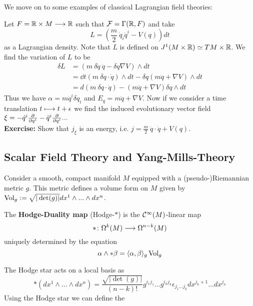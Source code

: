We move on to some examples of classical Lagrangian field theories:

\begin{example}
  Let $F= \mathbb{R} \times M \longrightarrow \mathbb{R}$ such that ${\mathcal{F}} = \Gamma(\mathbb{R}, F)$ and take
  $$L = \left(\frac{m}{2} \ \dot q_i \dot q^i - V(q) \right) dt$$
  as a Lagrangian density. Note that $L$ is defined on $J^1(M \times \mathbb{R}) \simeq TM \times \mathbb{R}$. We find the variation of $L$ to be
  \begin{align}
    \delta L &= \left( m \ \delta \dot q \ \dot q - \delta q \nabla V \right) \wedge dt \\
    &= \dd{}{t} \left( m \ \delta q \cdot \dot q \right) \wedge dt - \delta q \left( m \ddot q + \nabla V \right) \wedge dt\\
    &= d \left( m \ \delta q \cdot \dot q \right) - \left( m \ddot q + \nabla V \right) \delta q \wedge dt
  \end{align}
  Thus we have $\alpha = m \dot q^i \delta q_i$ and $E_q = m \ddot q + \nabla V$. Now if we consider a time translation $t \lmap t + \epsilon$ we find the induced evolutionary vector field $\xi = - \dot q^i \frac{\partial }{\partial q^i} - \ddot q^i \frac{\partial }{\partial q^i} ...$\\
  \textbf{Exercise:} Show that $j_\xi$ is an energy, i.e. $j = \frac{m}{2} \ \dot q \cdot \dot q + V(q)$.
\end{example}

\newpage
\subsection{Scalar Field Theory and Yang-Mills-Theory}

Consider a smooth, compact manifold $M$ equipped with a (pseudo-)Riemannian metric $g$. This metric defines a volume form on $M$ given by $\operatorname{Vol}_g := \sqrt{|\det(g)|} dx^1 \wedge ... \wedge dx^n$.

\begin{definition}
  The \textbf{Hodge-Duality map} (Hodge-$*$) is the $\mathcal{C}^{\infty}(M)$-linear map
  $$ * \colon \Omega^k(M) \longrightarrow \Omega^{n-k}(M) $$
  uniquely determined by the equation
  $$ \alpha \wedge * \beta = \langle \alpha, \beta \rangle_g \operatorname{Vol}_g $$
\end{definition}

The Hodge star acts on a local basis as
$$ *(dx^1\wedge ... \wedge dx^n) = \frac{\sqrt{|\det(g)|}}{(n-k)!} g^{i_1 j_1} ... g^{i_k j_k} \epsilon_{j_1 ... j_k} dx^{j_k+1} ... dx^{j_n} $$
Using the Hodge star we can define the

